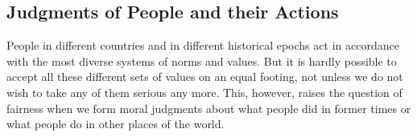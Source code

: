 \documentclass[12pt,a4paper,ngerman]{article}
\begin{document}
\subsection{Judgments of People and their Actions}



People in different countries and in different historical epochs act in
accordance with the most diverse systems of norms and values. But it is hardly
possible to accept all these different sets of values on an equal footing, not
unless we do not wish to take any of them serious any more. This, however,
raises the question of fairness when we form moral judgments about what people
did in former times or what people do in other places of the world.
\end{document}
